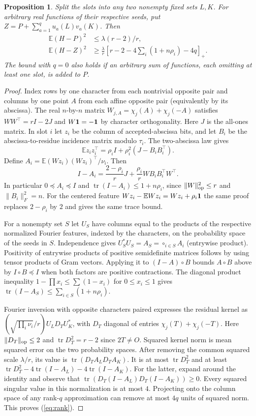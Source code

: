 \documentclass[11pt]{article}
\newtheorem{proposition}{Proposition}
\newcommand{\E}{\mathbb E}
\newcommand{\tr}{\operatorname{tr}}
\begin{document}
\begin{proposition}
Split the slots into any two nonempty fixed sets $L,K$. For arbitrary
real functions of their respective seeds, put
$Z=P+\sum_{a=1}^q u_a(L)v_a(K)$. Then
\begin{align}
 \E (H-P)^2 &\le \lambda(r-2)/r,\label{eq:upper}\\
 \E (H-Z)^2 &\ge
 \frac{\lambda}{r}\left[r-2-4\sum_i(1+n\rho_i)-4q\right]_+ .
 \label{eq:rank}
\end{align}
The bound with $q=0$ also holds if an arbitrary sum of functions,
each omitting at least one slot, is added to $P$.
\end{proposition}
\begin{proof}
Index rows by one character from each nontrivial opposite pair and
columns by one point $A$ from each affine opposite pair (equivalently
by its abscissa). The real $n$-by-$n$ matrix
$W_{j,A}=\chi_j(A)+\chi_j(-A)$ satisfies
$WW^\top=rI-2J$ and $W{\bf1}=-{\bf1}$ by character orthogonality.
Here $J$ is the all-ones matrix. In slot $i$ let $z_i$ be the column
of accepted-abscissa bits, and let $B_i$ be the abscissa-to-residue
incidence matrix modulo $\tau_i$. The two-abscissa law gives
\[
 \E z_i z_i^\top=\rho_i I+\rho_i^2(J-B_iB_i^\top).
\]
Define $A_i=\E (Wz_i)(Wz_i)^\top/\nu_i$. Then
\[
 I-A_i=\frac{2-\rho_i}{r}J+
             \frac{\rho_i}{r}W B_iB_i^\top W^\top .
\]
In particular $0\preceq A_i\preceq I$ and
$\tr(I-A_i)\le 1+n\rho_i$, since
$\|W\|_{\rm op}^2\le r$ and $\|B_i\|_F^2=n$. For the centered
feature $Wz_i-\E Wz_i=Wz_i+\rho_i{\bf1}$ the same proof replaces
$2-\rho_i$ by $2$ and gives the same trace bound.

For a nonempty set $S$ let $U_S$ have columns equal to the products
of the respective normalized Fourier features, indexed by the
characters, on the probability space of the seeds in $S$.
Independence gives $U_S^*U_S=A_S=\mathop{\circ}_{i\in S}A_i$
(entrywise product). Positivity of entrywise products of positive
semidefinite matrices follows by using tensor products of Gram
vectors. Applying it to $(I-A)\circ B$ bounds $A\circ B$ above by
$I\circ B\preceq I$ when both factors are positive contractions.
The diagonal product inequality $1-\prod x_i\le\sum(1-x_i)$ for
$0\le x_i\le1$ gives
$\tr(I-A_S)\le\sum_{i\in S}(1+n\rho_i)$.

Fourier inversion with opposite characters paired expresses the
residual kernel as $(\sqrt{\prod_i\nu_i}/r)U_L D_T U_K^*$, with
$D_T$ diagonal of entries $\chi_j(T)+\chi_j(-T)$.
Here $\|D_T\|_{\rm op}\le2$ and $\tr D_T^2=r-2$ since $2T\ne O$.
Squared kernel norm is mean squared error on the two probability
spaces. After removing the common squared scale $\lambda/r$, its
value is $\tr(D_T A_L D_T A_K)$. It is at most $\tr D_T^2$ and
at least $\tr D_T^2-4\tr(I-A_L)-4\tr(I-A_K)$. For the latter,
expand around the identity and observe that
$\tr(D_T(I-A_L)D_T(I-A_K))\ge0$. Every squared singular value in
this normalization is at most $4$. Projecting onto the column space
of any rank-$q$ approximation can remove at most $4q$ units of
squared norm. This proves (\ref{eq:rank}).


\end{proof}
\end{document}
